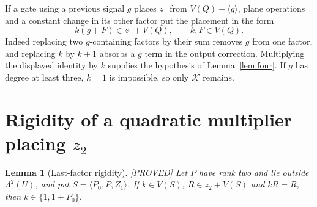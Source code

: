 \documentclass[11pt,a4paper]{article}
\newtheorem{lemma}[theorem]{Lemma}
\newcommand{\status}[1]{\hfill\textsf{[#1]}}
\begin{document}
If a gate using a previous signal $g$ places $z_1$ from $V(Q)+\langle g\rangle$, plane operations and a constant change in its other factor put the placement in the form
\[
k(g+F)\in z_1+V(Q),\qquad k,F\in V(Q).
\]
Indeed replacing two $g$-containing factors by their sum removes $g$ from one factor, and replacing $k$ by $k+1$ absorbs a $g$ term in the output correction. Multiplying the displayed identity by $k$ supplies the hypothesis of Lemma~\ref{lem:four}. If $g$ has degree at least three, $k=1$ is impossible, so only $\mathcal K$ remains.

\section[Rigidity of a quadratic multiplier placing z2]{Rigidity of a quadratic multiplier placing $z_2$}
\begin{lemma}[Last-factor rigidity]\label{lem:lastfactor}\status{PROVED}
Let $P$ have rank two and lie outside $\Lambda^2(U)$, and put $S=\langle P_0,P,Z_1\rangle$. If $k\in V(S)$, $R\in z_2+V(S)$ and $kR=R$, then $k\in\{1,1+P_0\}$.
\end{lemma}
\end{document}
